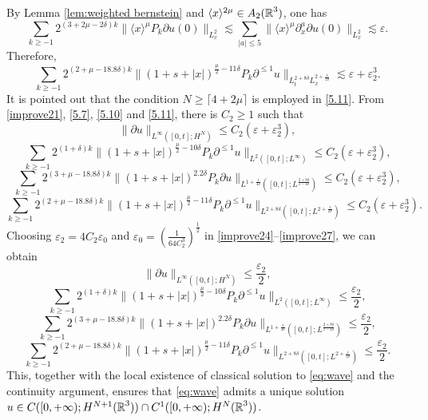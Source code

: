 \documentclass[11pt,twoside]{article}
\def\R{\mathop{\mathbb R\kern 0pt}\nolimits}
\def\f{\frac}
\def\p{\partial}
\def\ve{\varepsilon}
\def\ls{\lesssim}
\newcommand{\w}[1]{\langle {#1} \rangle}
\theoremstyle{plain}
\theoremstyle{definition}
\numberwithin{equation}{section}
\begin{document}
By Lemma \ref{lem:weighted bernstein} and $\w{x}^{2\mu}\in A_2(\R^3)$, one has
\begin{equation*}
	\sum_{k\ge -1}2^{(3+2\mu-2\delta) k}
	\|\w{x}^{\mu}P_k\partial u(0)\|_{L^2_x}
	\ls
	\sum_{|a|\le 5}\|\w{x}^{\mu}\p^a_x\partial u(0)\|_{L^2_x}\ls \ve.
\end{equation*}
Therefore,
\begin{equation}\label{5.11}
	\sum_{k\ge -1}2^{(2 +\mu -18.8\delta) k}\|(1+s+|x|)^{\f{\mu}{2}-11\delta} P_{k}\p^{\le 1} u\|_{L_t^{2+8\delta}L^{2+\f{1}{2\delta}}_x}\ls \ve+\ve^3_2.
\end{equation}
It is pointed out that the condition $N \ge \lceil 4+2\mu \rceil$ is employed in \eqref{5.11}.
From \eqref{improve21}, \eqref{5.7}, \eqref{5.10} and \eqref{5.11}, there is $C_2 \ge 1$ such that
\begin{equation}\label{improve24}
\|\p u\|_{L^\infty([0,t];H^N)}\le C_2(\varepsilon +\varepsilon_2^3),
\end{equation}
\begin{equation}\label{improve25}
\sum_{k\ge-1}2^{(1+\delta) k}\|(1+s+|x|)^{\f{\mu}{2}-10\delta}P_k\p^{\le 1} u\|_{L^{2}([0,t];L^\infty)}
\le C_2(\varepsilon +\varepsilon_2^3),
\end{equation}
\begin{equation}\label{improve26}
\sum_{k\ge-1}2^{(3 +\mu -18.8\delta) k} \|(1+s+|x|)^{2.2\delta}P_{k}\p u\|_{L^{1+\f{1}{4\delta}}([0,t];L^{\f{2+8\delta}{1-4\delta}})}
\le C_2(\varepsilon +\varepsilon_2^3),
\end{equation}
\begin{equation}\label{improve27}
	\sum_{k\ge-1}2^{(2 +\mu -18.8\delta) k} \|(1+s+|x|)^{\f{\mu}{2}-11\delta}P_{k}\p^{\le 1} u\|_{L^{2+8\delta}([0,t];L^{2+\f{1}{2\delta}})}
	\le C_2(\varepsilon +\varepsilon_2^3).
\end{equation}
Choosing $\varepsilon_2 = 4C_2 \varepsilon_0$ and $\ve_0 = \left(\f{1}{64C^3_2}\right)^{\f12}$ in \eqref{improve24}--\eqref{improve27}, we can obtain
\begin{equation*}
\|\p u\|_{L^\infty([0,t];H^N)}\le \f{\varepsilon_2}2,	
\end{equation*}
\begin{equation*}
\sum_{k\ge-1}2^{(1+\delta) k}\|(1+s+|x|)^{\f{\mu}{2}-10\delta}P_k\p^{\le 1} u\|_{L^{2}([0,t];L^\infty)}
\le \f{\varepsilon_2}2,	
\end{equation*}
\begin{equation*}
\sum_{k\ge-1}2^{(3 +\mu -18.8\delta) k} \|(1+s+|x|)^{2.2\delta}P_{k}\p u\|_{L^{1+\f{1}{4\delta}}([0,t];L^{\f{2+8\delta}{1-4\delta}})}
\le \f{\varepsilon_2}2,	
\end{equation*}
\begin{equation*}
\sum_{k\ge-1}2^{(2 +\mu -18.8\delta) k} \|(1+s+|x|)^{\f{\mu}{2}-11\delta}P_{k}\p^{\le 1} u\|_{L^{2+8\delta}([0,t];L^{2+\f{1}{2\delta}})}
\le\f{\varepsilon_2}2.
\end{equation*}
This, together with the local existence of classical solution to \eqref{eq:wave} and the continuity argument, ensures that
\eqref{eq:wave} admits a unique solution $u\in C([0,+\infty);H^{N+1}(\R^3))\cap C^1([0,+\infty);H^{N}(\R^3))$.
\end{document}
